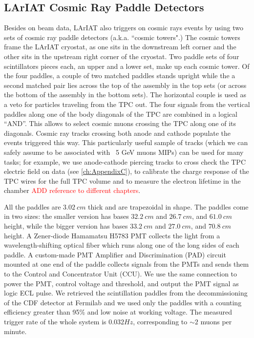 \subsection{LArIAT Cosmic Ray Paddle Detectors}\label{sec:CosmicRayPaddle}
Besides on beam data, LArIAT also triggers on cosmic rays events by using two sets of cosmic ray paddle detectors (a.k.a. ``cosmic towers".) The cosmic towers frame the LArIAT cryostat, as one sits in the downstream left corner and the other sits in the upstream right corner of the cryostat. Two paddle sets of four scintillators pieces each, an upper and a lower set, make up each cosmic tower. 
Of the four paddles, a couple of two matched paddles stands upright while the a second matched pair lies across the top of the assembly in the top sets (or across the bottom of the assembly in the bottom sets). The horizontal couple is used as a veto for particles traveling from the TPC out.  The four signals  from the vertical paddles along one of the body diagonals of the TPC are combined in a logical ``AND''. This allows to select cosmic muons crossing the TPC along one of its diagonals.  Cosmic ray tracks crossing both anode and cathode populate the events triggered this way. This particularly useful sample of tracks (which we can safely assume to be associated with ~5 GeV muons MIPs) can be used for many tasks; for example, we use anode-cathode piercing tracks to cross check the TPC electric field on data (see \ref{ch:AppendixC}), to calibrate the charge response of the TPC wires for the full TPC volume and to measure the electron lifetime in the chamber \textcolor{red}{ ADD reference to different chapters}.

All the paddles are $3.02~cm$ thick and are  trapezoidal in shape. The paddles come in two sizes: the smaller version has bases $32.2~cm$ and $26.7~cm$, and $61.0~cm$ height, while the bigger version has bases $33.2~cm$ and $27.0~cm$, and $70.8~cm$ height.  A Zener-diode Hamamatsu H5783 PMT collects the light from a wavelength-shifting optical fiber which runs along one of the long sides of each paddle.
A custom-made PMT Amplifier and Discrimination (PAD) circuit mounted at one end of the paddle collects signals from the PMTs and sends them to the Control and Concentrator Unit (CCU). We use the same connection to  power the PMT, control voltage and threshold, and output the PMT signal as logic ECL pulse.
We retrieved the scintillation paddles from the decommissioning of the CDF detector at Fermilab and we used only the paddles with a counting efficiency greater than 95\% and low noise at working voltage. The measured trigger rate of the whole system is $0.032Hz$, corresponding to $\sim 2$ muons per minute.


